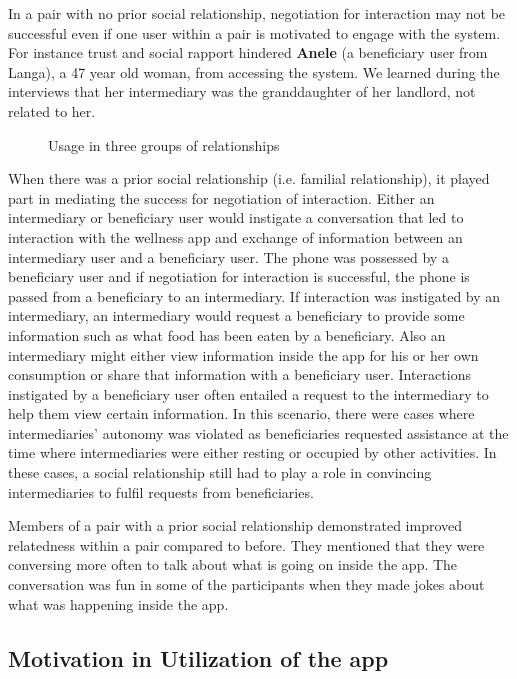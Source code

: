 \documentclass{sig-alternate}
\begin{document}
In a pair with no prior social relationship, negotiation for interaction may
not be successful even if one user within a pair is motivated to engage with
the system. For instance trust and social rapport hindered \textbf{Anele} (a
beneficiary user from Langa), a 47 year old woman, from accessing the system.
We learned during the interviews that her intermediary was the granddaughter
of her landlord, not related to her.


 \begin{figure}
\centering
{}
\caption{Usage in three groups of relationships}
\label{figure:relation}
\end{figure}

When there was a prior social relationship (i.e. familial relationship), it
played part in mediating the success for negotiation of interaction. Either an
intermediary or beneficiary user would instigate a conversation that led to
interaction with the wellness app and exchange of information between an
intermediary user and a beneficiary user. The phone was possessed by a
beneficiary user and if negotiation for interaction is successful, the phone
is passed from a beneficiary to an intermediary. If interaction was instigated
by an intermediary, an intermediary would request a beneficiary to provide
some information such as what food has been eaten by a beneficiary. Also an
intermediary might either view information inside the app for his or her own
consumption or share that information with a beneficiary user. Interactions
instigated by a beneficiary user often entailed a request to the
intermediary to help them view certain information. In this scenario, there
were cases where intermediaries' autonomy was violated as beneficiaries
requested assistance at the time where intermediaries were either resting or
occupied by other activities. In these cases, a social relationship still had
to play a role in convincing intermediaries to fulfil requests from
beneficiaries.

Members of a pair with a prior social relationship demonstrated improved
relatedness within a pair compared to before. They mentioned that they were
conversing more often to talk about what is going on inside the app. The
conversation was fun in some of the participants when they made jokes about
what was happening inside the app.

\subsection{Motivation in Utilization of the app}
\end{document}
